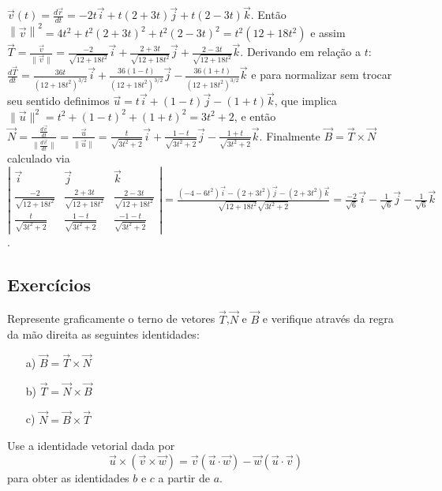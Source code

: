  $\vec{v}(t) = \frac{d \vec{r}}{dt} = -2t \vec{i} + t(2+3t) \vec{j} + t(2-3t)\vec{k}$. Então $\left\|\vec{v} \right\|^2 = 4t^2 + t^2(2+3t)^2 + t^2(2-3t)^2 = t^2(12+18t^2)$ e assim $\vec{T} = \frac{\vec{v}}{\|\vec{v}\|} = \frac{-2 }{\sqrt{12+18t^2}}\vec{i} + \frac{2+3t}{\sqrt{12+18t^2}}\vec{j} + \frac{2-3t}{\sqrt{12+18t^2}}\vec{k}$. Derivando em relação a $t$: $\frac{d\vec{T}}{dt} = \frac{36t}{(12+18t^2)^{3/2}} \vec{i} + \frac{36(1-t)}{(12+18t^2)^{3/2}} \vec{j} - \frac{36(1+t)}{(12+18t^2)^{3/2}} \vec{k} $ e para normalizar sem trocar seu sentido definimos $\vec{u} = t \vec{i} + (1-t) \vec{j} - (1+t)\vec{k}$, que implica $\|\vec{u}\|^2=t^2 + (1-t)^2 + (1+t)^2 = 3t^2 + 2$, e então $\vec{N} = \frac{\frac{d\vec{v}}{dt}}{\|\frac{d\vec{v}}{dt}\|} = \frac{\vec{u}}{\|\vec{u}\|}=\frac{t}{\sqrt{3t^2+2}} \vec{i} + \frac{1-t}{\sqrt{3t^2+2}} \vec{j} - \frac{1+t}{\sqrt{3t^2+2}} \vec{k}$. Finalmente $ \vec{B} = \vec{T} \times \vec{N}$ calculado via $\left| \begin{array}{ccc}
\vec{i} & \vec{j} & \vec{k} \\
\frac{-2}{\sqrt{12+18t^2}} & \frac{2+3t}{\sqrt{12+18t^2}} & \frac{2-3t}{\sqrt{12+18t^2}} \\
\frac{t}{\sqrt{3t^2+2}} & \frac{1-t}{\sqrt{3t^2+2}} &  \frac{-1-t}{\sqrt{3t^2+2}} \end{array} \right| = \frac{(-4-6t^2)\vec{i} - (2+3t^2)\vec{j} - (2+3t^2)\vec{k}}{ \sqrt{12+18t^2} \sqrt{3t^2+2}} = \frac{-2}{\sqrt{6}} \vec{i} - \frac{1}{\sqrt{6}} \vec{j} - \frac{1}{\sqrt{6}} \vec{k}$.



\subsection*{Exercícios}

\begin{exer} Represente graficamente o terno de vetores $\vec{T}$,$\vec{N}$ e $\vec{B}$ e verifique através da regra da mão direita as seguintes identidades:
\begin{itemize}
\item[a)]$\vec{B}=\vec{T}\times\vec{N}$
\item[b)]$\vec{T}=\vec{N}\times\vec{B}$
\item[c)]$\vec{N}=\vec{B}\times\vec{T}$
\end{itemize}
Use a identidade vetorial dada por
$$\vec{u}\times\left(\vec{v}\times\vec{w}\right)=\vec{v}\left(\vec{u}\cdot\vec{w}\right)-\vec{w}\left(\vec{u}\cdot\vec{v}\right)$$ para obter as identidades $b$ e $c$ a partir de $a$.
\end{exer}


